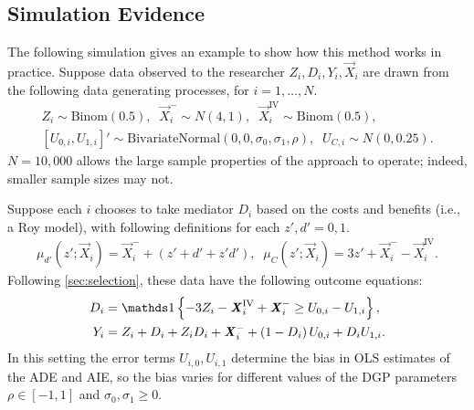 \subsection{Simulation Evidence}
The following simulation gives an example to show how this method works in practice.
Suppose data observed to the researcher $Z_i, D_i, Y_i, \vec X_i$ are drawn from the following data generating processes, for $i = 1, \hdots, N$.
\begin{align*}
    Z_i \sim \text{Binom}\left(0.5 \right),
    \;\; \vec X_i^- \sim N(4, 1),
    \;\; \vec X_i^{\text{IV}} \sim \text{Binom}\left( 0.5 \right), \\
    \left[ U_{0,i}, U_{1,i} \right]' \sim
    \text{BivariateNormal}\left( 0, 0, \sigma_0, \sigma_1, \rho \right),
    \;\; U_{C,i} \sim N(0, 0.25).
\end{align*}
$N = 10,000$ allows the large sample properties of the approach to operate; indeed, smaller sample sizes may not.

Suppose each $i$ chooses to take mediator $D_i$ based on the costs and benefits (i.e., a Roy model), with following definitions for each $z', d' = 0, 1$.
\begin{align*}
    \mu_{d'}\left(z' ; \vec X_i \right) = \vec X_i^- + \left( z' + d' + z' d' \right),
    \;\; \mu_{C}\left(z' ; \vec X_i \right) = 3z' + \vec X_i^- - \vec X_i^{\text{IV}}.
\end{align*}
Following \autoref{sec:selection}, these data have the following outcome equations:
\begin{align*}
    D_i &= \indicator{-3Z_i - \vec X_i^{\text{IV}} + \vec X_i^- \geq U_{0,i} - U_{1,i}},  \\
    Y_i &= Z_i + D_i + Z_i D_i + \vec X_i^-
        + \left( 1 - D_i \right) U_{0,i} + D_i U_{1,i}.
\end{align*}
In this setting the error terms $U_{i, 0}, U_{i, 1}$ determine the bias in OLS estimates of the ADE and AIE, so the bias varies for different values of the DGP parameters $\rho \in [-1, 1]$ and $\sigma_0, \sigma_1 \geq 0$.


